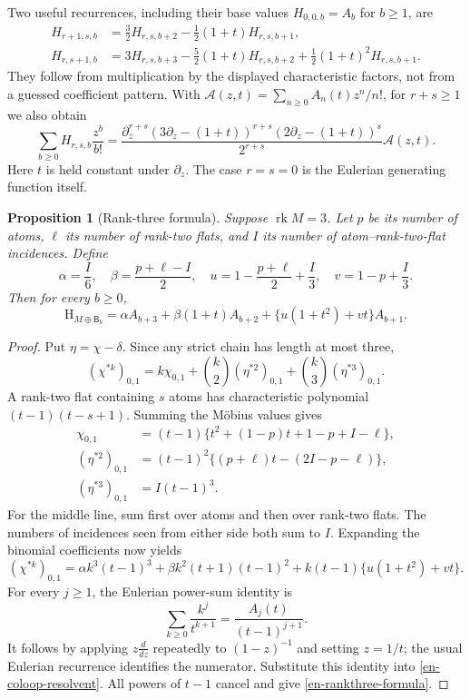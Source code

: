 \documentclass[12pt]{amsart}
\newtheorem{prop}[thm]{Proposition}
\theoremstyle{definition}
\theoremstyle{remark}
\numberwithin{equation}{section}
\newcommand{\rk}{\operatorname{rk}}
\newcommand{\HCh}{\mathrm{H}}
\newcommand{\Bmat}{\mathsf{B}}
\begin{document}
Two useful recurrences, including their base values $H_{0,0,b}=A_b$ for $b\geq1$, are
\begin{align*}
 H_{r+1,s,b}&=\tfrac32H_{r,s,b+2}-\tfrac12(1+t)H_{r,s,b+1},\\
 H_{r,s+1,b}&=3H_{r,s,b+3}-\tfrac52(1+t)H_{r,s,b+2}
                         +\tfrac12(1+t)^2H_{r,s,b+1}.
\end{align*}
They follow from multiplication by the displayed characteristic factors, not from a guessed coefficient pattern. With $\mathcal A(z,t)=\sum_{n\geq0}A_n(t)z^n/n!$, for $r+s\geq1$ we also obtain
\begin{equation}\label{en-block-egf}
 \sum_{b\geq0}H_{r,s,b}\frac{z^b}{b!}
 =\frac{\partial_z^{r+s}(3\partial_z-(1+t))^{r+s}
                (2\partial_z-(1+t))^s}{2^{r+s}}\mathcal A(z,t).
\end{equation}
Here $t$ is held constant under $\partial_z$. The case $r=s=0$ is the Eulerian generating function itself.

\begin{samepage}
\begin{prop}[Rank-three formula]\label{en-rankthree}
Suppose $\rk M=3$. Let $p$ be its number of atoms, $\ell$ its number of rank-two flats, and $I$ its number of atom--rank-two-flat incidences. Define
\begin{equation}\label{en-parameters}
 \alpha=\frac I6,\quad \beta=\frac{p+\ell-I}{2},\quad
 u=1-\frac{p+\ell}{2}+\frac I3,\quad v=1-p+\frac I3.
\end{equation}
Then for every $b\geq0$,
\begin{equation}\label{en-rankthree-formula}
 \HCh_{M\oplus\Bmat_b}
 =\alpha A_{b+3}+\beta(1+t)A_{b+2}
       +\{u(1+t^2)+vt\}A_{b+1}.
\end{equation}
\end{prop}
\end{samepage}
\begin{proof}
Put $\eta=\chi-\delta$. Since any strict chain has length at most three,
\[
 (\chi^{*k})_{0,1}=k\chi_{0,1}+\binom{k}{2}(\eta^{*2})_{0,1}
                         +\binom{k}{3}(\eta^{*3})_{0,1}.
\]
A rank-two flat containing $s$ atoms has characteristic polynomial $(t-1)(t-s+1)$. Summing the Möbius values gives
\begin{align*}
 \chi_{0,1}&=(t-1)\{t^2+(1-p)t+1-p+I-\ell\},\\
 (\eta^{*2})_{0,1}&=(t-1)^2\{(p+\ell)t-(2I-p-\ell)\},\\
 (\eta^{*3})_{0,1}&=I(t-1)^3.
\end{align*}
For the middle line, sum first over atoms and then over rank-two flats. The numbers of incidences seen from either side both sum to $I$. Expanding the binomial coefficients now yields
\[
 (\chi^{*k})_{0,1}
 =\alpha k^3(t-1)^3+\beta k^2(t+1)(t-1)^2
   +k(t-1)\{u(1+t^2)+vt\}.
\]
For every $j\geq1$, the Eulerian power-sum identity is
\[
 \sum_{k\geq0}\frac{k^j}{t^{k+1}}=\frac{A_j(t)}{(t-1)^{j+1}}.
\]
It follows by applying $z\frac{d}{dz}$ repeatedly to $(1-z)^{-1}$ and setting $z=1/t$; the usual Eulerian recurrence identifies the numerator. Substitute this identity into \eqref{en-coloop-resolvent}. All powers of $t-1$ cancel and give \eqref{en-rankthree-formula}.
\end{proof}
\end{document}
